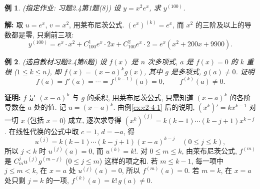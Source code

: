 \documentclass[UTF8,openany]{ctexbook}
\theoremstyle{chinesetextbook}
\newtheorem{example}{例}[section]
\newenvironment{cnproof}{\par\indent\textbf{证明:} \ignorespaces}{\par}
\newenvironment{cnsolution}{\par\indent\textbf{解:} \ignorespaces}{\par}
\begin{document}
\begin{example}\label{ex:c2-h4-1b}
\textnormal{(指定作业: 习题2.4第1题(8))} 设 $y=x^2e^x$, 求 $y^{(100)}$.
\end{example}
\begin{cnsolution}
取 $u=e^x$, $v=x^2$, 用莱布尼茨公式. $(e^x)^{(k)}=e^x$, 而 $x^2$ 的三阶及以上的导数都是零, 只剩前三项:
\[
y^{(100)}=e^x\cdot x^2+C_{100}^1e^x\cdot2x+C_{100}^2e^x\cdot2=e^x(x^2+200x+9900).
\]
\end{cnsolution}
\begin{example}\label{ex:c2-h4-6}
\textnormal{(选自教材习题2.4第6题)} 设 $f(x)$ 是 $n$ 次多项式, $a$ 是 $f(x)=0$ 的 $k$ 重根 ($1\le k\le n$), 即 $f(x)=(x-a)^kg(x)$, 其中 $g$ 是多项式, $g(a)\ne0$. 证明
\[
f(a)=f'(a)=\cdots=f^{(k-1)}(a)=0,\qquad f^{(k)}(a)\ne0.
\]
\end{example}
\begin{cnproof}
$f$ 是 $(x-a)^k$ 与 $g$ 的乘积, 用莱布尼茨公式, 只需知道 $(x-a)^k$ 的各阶导数在 $a$ 处的值. 记 $u=(x-a)^k$. 由例\ref{ex:c2-4-1} 后的说明, $(x^k)'=kx^{k-1}$ 对一切 $x$ (包括 $x=0$) 成立, 逐次求导得 $(x^k)^{(j)}=k(k-1)\cdots(k-j+1)x^{k-j}$. 在线性代换的公式中取 $c=1$, $d=-a$, 得
\[
u^{(j)}=k(k-1)\cdots(k-j+1)(x-a)^{k-j}\quad(0\le j\le k),
\]
所以 $j<k$ 时 $u^{(j)}(a)=0$, 而 $u^{(k)}=k!$. 对 $0\le m\le k$, 由莱布尼茨公式, $f^{(m)}$ 是 $C_m^ju^{(j)}g^{(m-j)}$ ($0\le j\le m$) 这样的项之和. 若 $m\le k-1$, 每一项中 $j\le m<k$, 在 $x=a$ 处 $u^{(j)}(a)=0$, 所以 $f^{(m)}(a)=0$. 若 $m=k$, 在 $x=a$ 处只剩 $j=k$ 的一项, $f^{(k)}(a)=k!\,g(a)\ne0$.
\end{cnproof}
\end{document}
